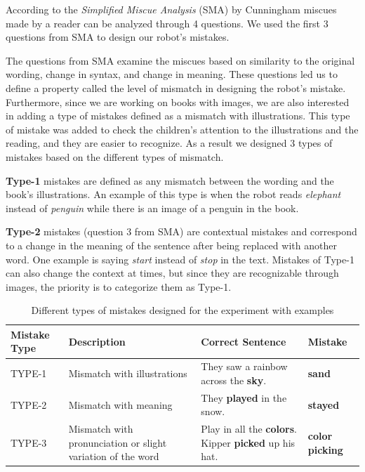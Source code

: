 \documentclass{sigchi}
\begin{document}
According to the \textit{Simplified Miscue Analysis} (SMA) by Cunningham \cite{cunningham1984simplified} %
miscues made by a reader can be analyzed through 4 questions. We used the first 3 questions from SMA to design our robot's mistakes. 

The questions from SMA examine the miscues based on similarity to the original wording, change in syntax, and change in meaning. 
These questions led us to define a property called the level of mismatch in designing the robot's mistake.
Furthermore, since we are working on books with images, we are also interested in adding a type of mistakes defined as a mismatch with illustrations. 
This type of mistake was added to check the children's attention to the illustrations and the reading, and they are easier to recognize. 
As a result we designed 3 types of mistakes based on the different types of mismatch.

\textbf{Type-1} mistakes are defined as any mismatch between the wording and the book's illustrations.
An example of this type is when the robot reads \textit{elephant} instead of \textit{penguin} while there is an image of a penguin in the book. 

\textbf{Type-2} mistakes (question 3 from SMA) are contextual mistakes and correspond to a change in the meaning of the sentence after being replaced with another word.
One example is saying  \textit{start} instead of \textit{stop} in the text. 
Mistakes of Type-1 can also change the context at times, but since they are recognizable through images, the priority is to categorize them as Type-1.

\begin{table}[t]
  \centering
  \footnotesize
  \renewcommand{\arraystretch}{1.8}
  \begin{tabular}{ |p{1.1cm} | p{2.1cm} | p{2.6cm}| p{1.1cm} | }
          \hline
          
          \textbf{Mistake Type} & \textbf{Description} & \textbf{Correct Sentence} & \textbf{Mistake} \\ \hline

          TYPE-1 & Mismatch with illustrations & They saw a rainbow across the \textbf{sky}. & \textbf{sand} \\ \hline 

          TYPE-2 & Mismatch with meaning & They \textbf{played} in the snow. & \textbf{stayed} \\ \hline

          TYPE-3 & Mismatch with pronunciation or slight variation of the word  & Play in all the \textbf{colors}. Kipper \textbf{picked} up his hat. & \textbf{color} \textbf{picking} \\ \hline
          


  \end{tabular}
  \renewcommand{\arraystretch}{1}
  \caption{Different types of mistakes designed for the experiment with examples}
  \label{tab:MistakeTab}
\end{table}
\end{document}
